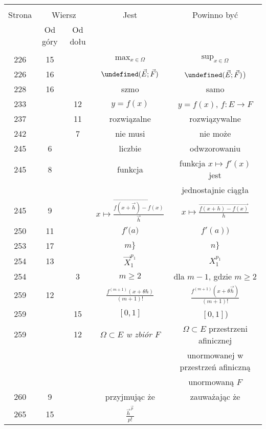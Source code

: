 \documentclass[a4paper]{article}
\newcommand{\mb}{\mathbb}
\let\L\undefined
\newcommand{\L}{\mb{L}}
\newcommand{\fr}{\frac}
\newcommand{\ra}{\rightarrow}
\newcommand{\ora}{\overrightarrow}
\begin{document}
\begin{center}
  \begin{tabular}{|c|c|c|c|c|}
    \hline
    & \multicolumn{2}{c|}{} & & \\
    Strona & \multicolumn{2}{c|}{Wiersz}& Jest & Powinno być \\ \cline{2-3}
    & Od góry & Od dołu &  &  \\ \hline
    & & & & \\
    226 & 15 & & $\mathrm{max}_{ x \in \Omega }$ & $\sup_{ x \in \Omega }$ \\
    226 & 16 & & $\L( \vec{ E }; \vec{ F } )$
           & $\L( \vec{ E }; \vec{ F } )$) \\
    228 & 16 & & szmo & samo \\
    233 & & 12 & $y = f( x )$ & $y = f( x )$, $f : E \ra F$ \\
    237 & & 11 & rozwiązalne & rozwiązywalne \\
    242 & & 7 & nie musi & nie może \\
    245 & 6 & & liczbie & odwzorowaniu \\
    245 & 8 & & funkcja & funkcja $x \mapsto f'( x )$ jest \\
    & & & & jednostajnie ciągła \\
    245 & 9 & & $x \mapsto \fr{ \ora{ f( x + \vec{ h } ) - f( x ) } }
                { \vec{ h } }$
           & $x \mapsto \fr{ \ora{ f( x + h ) - f( x ) } }{ h }$ \\
    250 & 11 & & $f'( a \Big)$ & $f'( a ) \Big)$ \\
    253 & 17 & & $m \}$ & $n \}$ \\
    254 & 13 & & $\vec{ X }^{ p_{ 1 } }_{ 1 }$ & $X^{ p_{ 1 } }_{ 1 }$ \\
    254 & & 3 & $m \geq 2$ & dla $m - 1$, gdzie $m \geq 2$ \\
    259 & 12 & & $\frac{ f^{ ( m + 1 ) }( x + \theta h ) }{ ( m + 1 )! }$
           & $\frac{ f^{ ( m + 1 ) }( x + \theta \vec{ h } ) }
             { ( m + 1 )! }$ \\
    259 & & 15 & $[ 0, 1 ]$ & $[ 0, 1 ]$) \\
    259 & & 12 & \emph{$\Omega \subset E$ w zbiór $F$}
           & $\Omega \subset E$ przestrzeni afinicznej \\
    & & & & unormowanej w przestrzeń afiniczną \\
    & & & & unormowaną $F$ \\
    260 & 9 & & przyjmując że & zauważając że \\
    265 & 15 & & $\fr{ \vec{ h }^{ \vec{ p } } }{ p! }$

\end{tabular}
\end{center}
\end{document}

